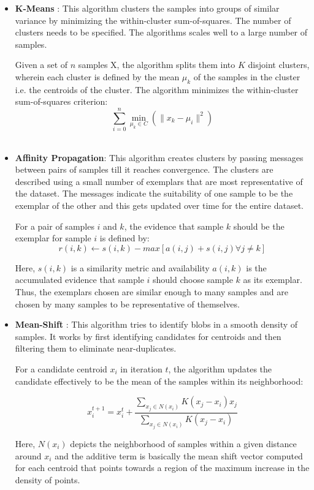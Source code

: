\begin{itemize}
\item \textbf{K-Means} :
This algorithm clusters the samples into groups of similar variance by
minimizing the within-cluster sum-of-squares. The number of clusters
needs to be specified. The algorithms scales well to a large number of
samples.

Given a set of $n$ samples X, the algorithm splits them into $K$ disjoint
clusters, wherein each cluster is defined by the mean $\mu_k$ of the samples in
the cluster i.e. the centroids of the cluster.
The algorithm minimizes the within-cluster sum-of-squares criterion:
$$\sum_{i=0}^{n}\min_{\mu_{k} \in C}(\| x_{k} - \mu_{i} \|^2)$$\\

\item \textbf{Affinity Propagation}:
This algorithm creates clusters by passing messages between pairs of samples
till it reaches convergence. The clusters are described using a small number of
exemplars that are most representative of the dataset.
The messages indicate the suitability of one sample to be the exemplar of the
other and this gets updated over time for the entire dataset.

For a pair of samples $i$ and $k$, the evidence that sample $k$ should be the
exemplar for sample $i$ is defined by:
$$r(i,k) \leftarrow s(i,k) - max [a(i,j) + s(i,j) \forall j\neq k ]$$

Here, $s(i, k)$ is a similarity metric and availability $a(i, k)$ is the
accumulated evidence that sample $i$ should choose sample $k$ as its exemplar.
Thus, the exemplars chosen are similar enough to many samples and are
chosen by many samples to be representative of themselves.\\

\item \textbf{Mean-Shift} :
This algorithm tries to identify blobs in a smooth density of samples.
It works by first identifying candidates for centroids and then filtering them
to eliminate near-duplicates.

For a candidate centroid $x_i$ in iteration $t$, the algorithm updates
the candidate effectively to be the mean of the samples within its neighborhood:

$$x_{i}^{t+1} = x_{i}^{t} + \frac{\sum_{x_{j} \in N(x_i)}K(x_{j} -
x_{i})x_{j}}{\sum_{x_{j} \in N(x_{i})}K(x_{j} - x_{i})} $$

Here, $N(x_i)$ depicts the neighborhood of samples within a given distance
around $x_i$ and the additive term is basically the mean shift vector
computed for each centroid that points towards a region of the maximum
increase in the density of points.\\


\end{itemize}
